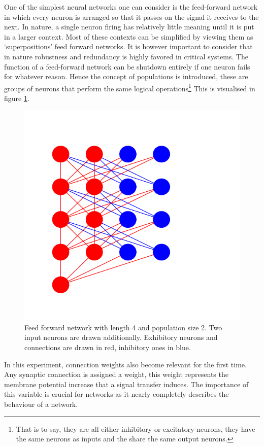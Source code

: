 \documentclass[a4paper,twocolumn]{article}
\begin{document}
One of the simplest neural networks one can consider is the feed-forward
network in which every neuron is arranged so that it passes on the signal it
receives to the next. In nature, a single neuron firing has relatively little
meaning until it is put in a larger context. Most of these contexts can be
simplified by viewing them as `superpositions' feed forward networks. It is
however important to consider that in nature robustness and redundancy is
highly favored in critical systems. The function of a feed-forward network can
be shutdown entirely if one neuron fails for whatever reason. Hence the concept
of populations is introduced, these are groups of neurons that perform the same
logical operations\footnote{That is to say, they are all either inhibitory or
excitatory neurons, they have the same neurons as inputs and the share the same
output neurons.} This is visualised in figure \ref{fig:feed-forward}.

\begin{figure}[ht]
    \centering
    \includegraphics[width=.5\textwidth]{figures/feedforward network.png}
    \caption{Feed forward network with length 4 and population size 2. Two input
        neurons are drawn additionally. Exhibitory neurons and connections are drawn
        in red, inhibitory ones in blue.}
    \label{fig:feed-forward}
\end{figure}

In this experiment, connection weights also become relevant for the first time.
Any synaptic connection is assigned a weight, this weight represents the
membrane potential increase that a signal transfer induces. The importance of
this variable is crucial for networks as it nearly completely describes the
behaviour of a network.
\end{document}
